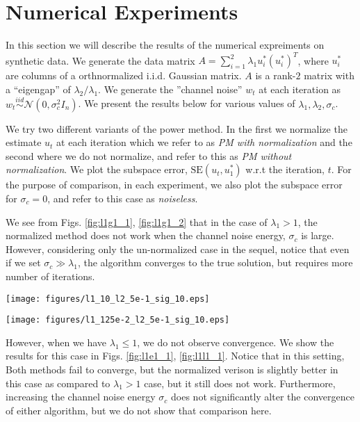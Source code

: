 \documentclass[10pt]{article}
\newcommand{\SE}{\mathrm{SE}}
\begin{document}

\section{Numerical Experiments}
In this section we will describe the results of the numerical expreiments on synthetic data. We generate the data matrix $A = \sum_{i=1}^2 \lambda_1 u_i^* (u_i^*)^T$, where $u_i^*$ are columns of a orthnormalized i.i.d. Gaussian matrix. $A$ is a rank-$2$ matrix with a ``eigengap'' of $\lambda_2/\lambda_1$. We generate the ''channel noise'' $w_t$ at each iteration as $w_t \overset{iid}{\sim} \mathcal{N}(0, \sigma_c^2 I_n)$. We present the results below for various values of $\lambda_1, \lambda_2, \sigma_c$. 

We try two different variants of the power method. In the first we normalize the estimate $u_t$ at each iteration which we refer to as {\em PM with normalization} and the second where we do not normalize, and refer to this as {\em PM without normalization}. We plot the subspace error, $\SE(u_t, u_1^*)$ w.r.t the iteration, $t$. For the purpose of comparison, in each experiment, we also plot the subspace error for $\sigma_c = 0$, and refer to this case as {\em noiseless}. 

We see from Figs. \ref{fig:l1g1_1}, \ref{fig:l1g1_2} that in the case of $\lambda_1 > 1$, the normalized method does not work when the channel noise energy, $\sigma_c$ is large. However, considering only the un-normalized case in the sequel, notice that even if we set $\sigma_c \gg \lambda_1$, the algorithm converges to the true solution, but requires more number of iterations.

\begin{minipage}[t]{.5\linewidth}
\centering
\texttt{[image: figures/l1\_10\_l2\_5e-1\_sig\_10.eps]}
\label{fig:l1g1_1}
\end{minipage}%
\begin{minipage}[t]{.5\linewidth}
\centering
\texttt{[image: figures/l1\_125e-2\_l2\_5e-1\_sig\_10.eps]}
\label{fig:l1g1_2}
\end{minipage}

However, when we have $\lambda_1 \leq 1$, we do not observe convergence. We show the results for this case in Figs. \ref{fig:l1e1_1}, \ref{fig:l1l1_1}. Notice that in this setting, Both methods fail to converge, but the normalized verison is slightly better in this case as compared to $\lambda_1 > 1$ case, but it still does not work. Furthermore, increasing the channel noise energy $\sigma_c$ does not significantly alter the convergence of either algorithm, but we do not show that comparison here. 
\end{document}
